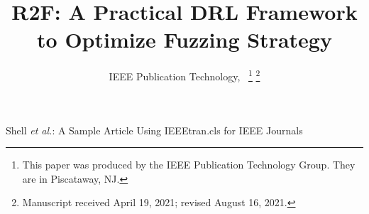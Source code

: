 \documentclass[lettersize,journal]{IEEEtran}
\begin{document}
\title{R2F: A Practical DRL Framework to Optimize Fuzzing Strategy}

\author{IEEE Publication Technology,~
\thanks{This paper was produced by the IEEE Publication Technology Group. They are in Piscataway, NJ.}%
\thanks{Manuscript received April 19, 2021; revised August 16, 2021.}}

%
{Shell \MakeLowercase{\textit{et al.}}: A Sample Article Using IEEEtran.cls for IEEE Journals}


\maketitle
\end{document}
